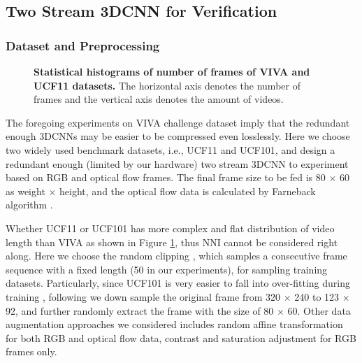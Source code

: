 \documentclass[a4paper,fleqn]{cas-dc}
\begin{document}
\subsection{Two Stream 3DCNN for Verification}

\subsubsection{Dataset and Preprocessing}\quad

\begin{figure}
\centering
{}
\caption{\textbf{Statistical histograms of number of frames of VIVA and UCF11 datasets.} The horizontal axis denotes the number of frames and the vertical axis denotes the amount of videos.}
\label{Fig_statistics}
\end{figure}

The foregoing experiments on VIVA challenge dataset imply that the redundant enough 3DCNNs may be easier to be compressed even losslessly. Here we choose two widely used benchmark datasets, i.e., UCF11 and UCF101, and design a redundant enough (limited by our hardware) two stream 3DCNN to experiment based on RGB and optical flow frames. The final frame size to be fed is 80 \(\times\) 60 as weight \(\times\) height, and the optical flow data is calculated by Farneback algorithm \citep{Farneback_2003_OpticalFlow}.

Whether UCF11 or UCF101 has more complex and flat distribution of video length than VIVA as shown in Figure \ref{Fig_statistics}, thus NNI cannot be considered right along. Here we choose the random clipping \citep{Varol_2018_LongTerm3DCNN,Simonyan_2014_TwoStream}, which samples a consecutive frame sequence with a fixed length (50 in our experiments), for sampling training datasets. Particularly, since UCF101 is very easier to fall into over-fitting during training \citep{Hara_2018_Res3DCNN}, following \citet{Varol_2018_LongTerm3DCNN} we down sample the original frame from 320 \(\times\) 240 to 123 \(\times\) 92, and further randomly extract the frame with the size of 80 \(\times\) 60. Other data augmentation approaches we considered includes random affine transformation for both RGB and optical flow data, contrast and saturation adjustment for RGB frames only.
\end{document}
